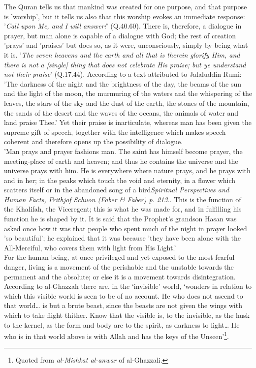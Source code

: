 \documentclass[10pt, twoside]{book}
\begin{document}
The Quran tells us that mankind was created for one purpose, and that purpose is 'worship', but it 
tells us also that this worship evokes an immediate response: '\emph{Call upon Me, and I will 
answer!}' (Q.40.60). There is, therefore, a dialogue in prayer, but man alone is capable of a dialogue 
with God; the rest of creation 'prays' and 'praises' but does so, as it were, unconsciously, simply 
by being what it is. '\emph{The seven heavens and the earth and all that is therein glorify Him, and there 
is not a [single] thing that does not celebrate His praise; but ye understand not their 
praise}' (Q.17.44). According to a text attributed to Jalaluddin Rumi: 'The darkness of the night and 
the brightness of the day, the beams of the sun and the light of the moon, the murmuring of the 
waters and the whispering of the leaves, the stars of the sky and the dust of the earth, the stones 
of the mountain, the sands of the desert and the waves of the oceans, the animals of water and land 
praise Thee.' Yet their praise is inarticulate, whereas man has been given the supreme gift of 
speech, together with the intelligence which makes speech coherent and therefore opens up the 
possibility of dialogue. \\

'Man prays and prayer fashions man. The saint has himself become prayer, the meeting\hyp{}place of earth 
and heaven; and thus he contains the universe and the universe prays with him. He is everywhere where 
nature prays, and he prays with and in her; in the peaks which touch the void and eternity, in a 
flower which scatters itself or in the abandoned song of a bird\emph{\emph{Spiritnal Perspectives and Human Facts}, Frithjof Schuon (Faber \& Faber) p. 213.}. This is the function of the 
Khalifah, the Viceregent; this is what he was made for, and in fulfilling his function he is shaped 
by it. It is said that the Prophet's grandson Hasan was asked once how it was that people who spent 
much of the night in prayer looked 'so beautiful'; he explained that it was because 'they have been 
alone with the All\hyp{}Merciful, who covers them with light from His Light.' \\

For the human being, at once privileged and yet exposed to the most fearful danger, living is a 
movement of the perishable and the unstable towards the permanent and the absolute; or else it is a 
movement towards disintegration. According to al\hyp{}Ghazzah there are, in the `invisible' world, 
`wonders in relation to which this visible world is seen to be of no account. He who does not ascend 
to that world\ldots{} is but a brute beast, since the beasts are not given the wings with which to take 
flight thither. Know that the visible is, to the invisible, as the husk to the kernel, as the form 
and body are to the spirit, as darkness to light\ldots{} He who is in that world above is with Allah and 
has the keys of the Unseen'\footnote{Quoted from \emph{al\hyp{}Mishkat al\hyp{}anwar} of al\hyp{}Ghazzali.}.\\
\end{document}
